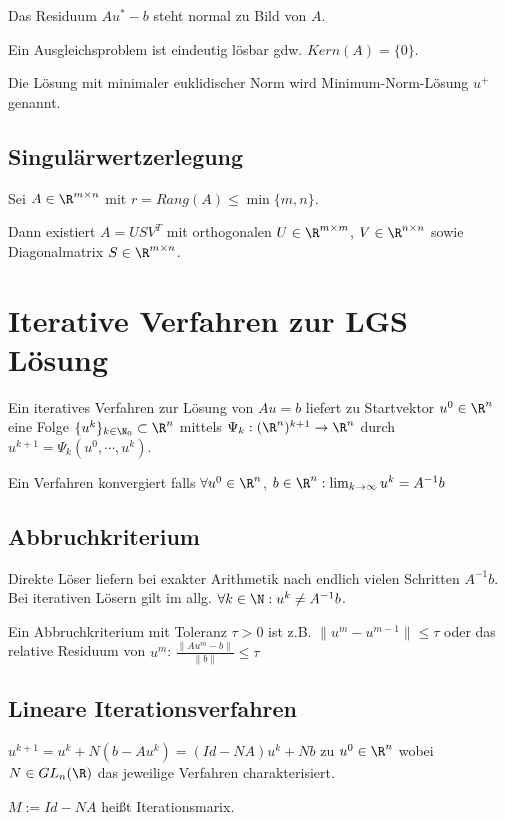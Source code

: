 Das Residuum $Au^*-b$ steht normal zu Bild von $A$.

Ein Ausgleichsproblem ist eindeutig lösbar gdw. $Kern(A) = \{0\}$.

Die Lösung mit minimaler euklidischer Norm wird Minimum-Norm-Lösung $u^+$ genannt.

\subsection*{Singulärwertzerlegung}

Sei $A \in \R^{m \times n}$ mit $r=Rang(A) \leq \min\{m,n\}$.

Dann existiert $A=USV^T$ mit orthogonalen $U \in \R^{m \times m}$, $V \in \R^{n \times n}$ sowie Diagonalmatrix $S \in \R^{m \times n}$.

\section*{Iterative Verfahren zur LGS Lösung}

Ein iteratives Verfahren zur Lösung von $Au=b$ liefert zu Startvektor $u^0 \in \R^n$ eine Folge $\{u^k\}_{k\in \N_0} \subset \R^n$ mittels $\Psi_k : (\R^n)^{k+1} \rightarrow \R^n$ durch $u^{k+1} = \Psi_k(u^0, \cdots, u^k)$.

Ein Verfahren konvergiert falls $\forall u^0 \in \R^n$, $b \in \R^n : \lim_{k\to \infty} u^k = A^{-1}b$

\subsection*{Abbruchkriterium}

Direkte Löser liefern bei exakter Arithmetik nach endlich vielen Schritten $A^{-1}b$. Bei iterativen Lösern gilt im allg. $\forall k \in \N : u^k \neq A^{-1}b$.

Ein Abbruchkriterium mit Toleranz $\tau > 0$ ist z.B. $\|u^m-u^{m-1}\| \leq \tau$ oder das relative Residuum von $u^m$: $\frac{\|Au^m-b\|}{\|b\|} \leq \tau$

\subsection*{Lineare Iterationsverfahren}

$u^{k+1} = u^k + N(b-Au^k) = (Id - NA)u^k + Nb$ zu $u^0 \in \R^n$ wobei $N \in GL_n(\R)$ das jeweilige Verfahren charakterisiert.

$M := Id - NA$ heißt Iterationsmarix.

